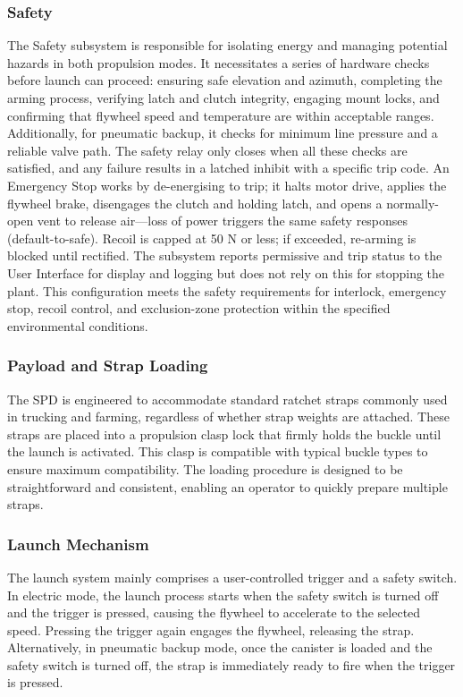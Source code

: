 \documentclass[a4paper,10pt]{article} %
\begin{document}
\subsubsection{Safety}

The Safety subsystem is responsible for isolating energy and managing potential hazards in both propulsion modes. It necessitates a series of hardware checks before launch can proceed: ensuring safe elevation and azimuth, completing the arming process, verifying latch and clutch integrity, engaging mount locks, and confirming that flywheel speed and temperature are within acceptable ranges. Additionally, for pneumatic backup, it checks for minimum line pressure and a reliable valve path. The safety relay only closes when all these checks are satisfied, and any failure results in a latched inhibit with a specific trip code. An Emergency Stop works by de-energising to trip; it halts motor drive, applies the flywheel brake, disengages the clutch and holding latch, and opens a normally-open vent to release air—loss of power triggers the same safety responses (default-to-safe). Recoil is capped at 50 N or less; if exceeded, re-arming is blocked until rectified. The subsystem reports permissive and trip status to the User Interface for display and logging but does not rely on this for stopping the plant. This configuration meets the safety requirements for interlock, emergency stop, recoil control, and exclusion-zone protection within the specified environmental conditions.

\subsubsection{Payload and Strap Loading}

The SPD is engineered to accommodate standard ratchet straps commonly used in trucking and farming, regardless of whether strap weights are attached. These straps are placed into a propulsion clasp lock that firmly holds the buckle until the launch is activated. This clasp is compatible with typical buckle types to ensure maximum compatibility. The loading procedure is designed to be straightforward and consistent, enabling an operator to quickly prepare multiple straps.

\subsubsection{Launch Mechanism} %

The launch system mainly comprises a user-controlled trigger and a safety switch. In electric mode, the launch process starts when the safety switch is turned off and the trigger is pressed, causing the flywheel to accelerate to the selected speed. Pressing the trigger again engages the flywheel, releasing the strap. Alternatively, in pneumatic backup mode, once the canister is loaded and the safety switch is turned off, the strap is immediately ready to fire when the trigger is pressed.
\end{document}
